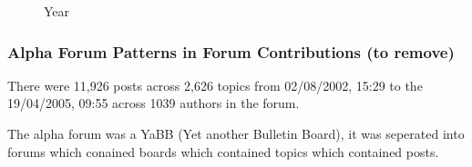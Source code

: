 \documentclass{article}
\begin{document}
\begin{figure}[h!] 
  \centering 
  
  \caption{Year}
  \label{figure:year}  
\end{figure}


%

%

%

%


\newpage
\subsubsection{Alpha Forum Patterns in Forum Contributions (to remove)}
There were 11,926 posts across 2,626 topics from 02/08/2002, 15:29 to the 19/04/2005, 09:55 across 1039 authors in the forum.

The alpha forum was a YaBB (Yet another Bulletin Board), it was seperated into forums which conained boards which contained topics which contained posts.




\end{document}

